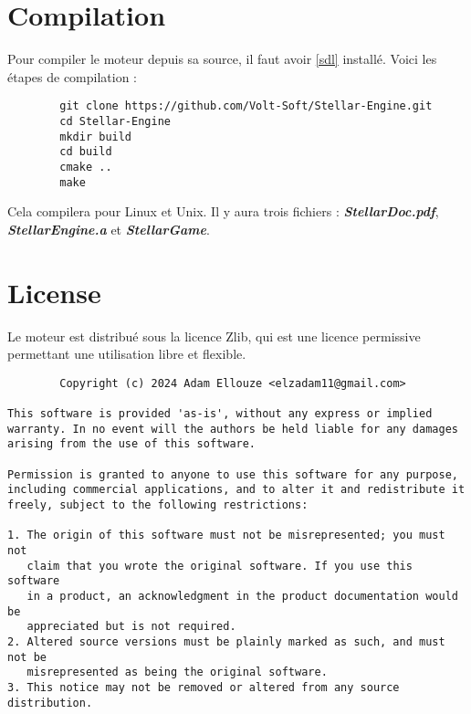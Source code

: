 \documentclass{article}
\numberwithin{equation}{section}    %
\begin{document}
    \section{Compilation}
    Pour compiler le moteur depuis sa source, il faut avoir \ref{sdl} installé. Voici les étapes de compilation : \vspace{0.5cm}

    \begin{lstlisting}
        git clone https://github.com/Volt-Soft/Stellar-Engine.git
        cd Stellar-Engine
        mkdir build
        cd build
        cmake ..
        make
    \end{lstlisting} \vspace{0.5cm}

    Cela compilera pour Linux et Unix. Il y aura trois fichiers : \textbf{\textit{StellarDoc.pdf}}, \textbf{\textit{StellarEngine.a}} et \textbf{\textit{StellarGame}}.


    \section{License}
    Le moteur est distribué sous la licence Zlib, qui est une licence permissive permettant une utilisation libre et flexible.

    \begin{lstlisting}
        Copyright (c) 2024 Adam Ellouze <elzadam11@gmail.com>

This software is provided 'as-is', without any express or implied
warranty. In no event will the authors be held liable for any damages
arising from the use of this software.

Permission is granted to anyone to use this software for any purpose,
including commercial applications, and to alter it and redistribute it
freely, subject to the following restrictions:

1. The origin of this software must not be misrepresented; you must not
   claim that you wrote the original software. If you use this software
   in a product, an acknowledgment in the product documentation would be
   appreciated but is not required.
2. Altered source versions must be plainly marked as such, and must not be
   misrepresented as being the original software.
3. This notice may not be removed or altered from any source distribution.
    \end{lstlisting}
\end{document}
